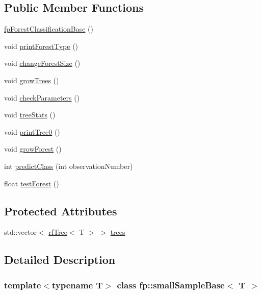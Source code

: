 \subsection*{Public Member Functions}
\begin{DoxyCompactItemize}
\item 
\hyperlink{classfp_1_1smallSampleBase_aa461f7076060995f561c3afc32e713fa}{fp\+Forest\+Classification\+Base} ()
\item 
void \hyperlink{classfp_1_1smallSampleBase_a1e3244a9a15d53d38e6c9ca78d8d062e}{print\+Forest\+Type} ()
\item 
void \hyperlink{classfp_1_1smallSampleBase_a92cbc7c3e09718ebe0704fbb16e44653}{change\+Forest\+Size} ()
\item 
void \hyperlink{classfp_1_1smallSampleBase_a68653c8bb30ad84acc2f9c4b29c85d2e}{grow\+Trees} ()
\item 
void \hyperlink{classfp_1_1smallSampleBase_a2078ad4ad755e11dcb3d05e9e902bd70}{check\+Parameters} ()
\item 
void \hyperlink{classfp_1_1smallSampleBase_acc948b260715a190675a5d5ebedf0429}{tree\+Stats} ()
\item 
void \hyperlink{classfp_1_1smallSampleBase_a5236048d1d219a61b74a6f47e344711d}{print\+Tree0} ()
\item 
void \hyperlink{classfp_1_1smallSampleBase_a8c5b6a0f2c8aeb32a322cc5e237c60af}{grow\+Forest} ()
\item 
int \hyperlink{classfp_1_1smallSampleBase_a616b7c06887cf4a1ac919bc3846a7933}{predict\+Class} (int observation\+Number)
\item 
float \hyperlink{classfp_1_1smallSampleBase_a02b01949b6ed9cc6644b045a468609cc}{test\+Forest} ()
\end{DoxyCompactItemize}
\subsection*{Protected Attributes}
\begin{DoxyCompactItemize}
\item 
std\+::vector$<$ \hyperlink{classfp_1_1rfTree}{rf\+Tree}$<$ T $>$ $>$ \hyperlink{classfp_1_1smallSampleBase_a9a3d92948248f1809d9f025b553512b6}{trees}
\end{DoxyCompactItemize}


\subsection{Detailed Description}
\subsubsection*{template$<$typename T$>$\newline
class fp\+::small\+Sample\+Base$<$ T $>$}



